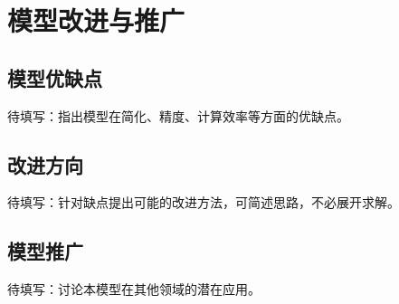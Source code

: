 \section{模型改进与推广}\label{sec:improvement}

\subsection{模型优缺点}
待填写：指出模型在简化、精度、计算效率等方面的优缺点。

\subsection{改进方向}
待填写：针对缺点提出可能的改进方法，可简述思路，不必展开求解。

\subsection{模型推广}
待填写：讨论本模型在其他领域的潜在应用。

